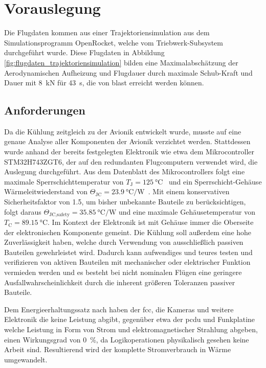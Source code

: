 \chapter{Vorauslegung}
\label{chap:Vorauslegung}



Die Flugdaten kommen aus einer Trajektoriensimulation aus dem Simulationsprogramm OpenRocket, welche vom Triebwerk-Subsystem durchgeführt wurde.
Diese Flugdaten in Abbildung \ref{fig:flugdaten_trajektoriensimulation} bilden eine Maximalabschätzung der Aerodynamischen Aufheizung und Flugdauer durch
maximale Schub-Kraft und Dauer mit \SI{8}{\kilo\newton} für \SI{43}{\second}, die von \ac{blast} erreicht werden können.

\section{Anforderungen}

Da die Kühlung zeitgleich zu der Avionik entwickelt wurde, musste auf eine genaue Analyse aller Komponenten der Avionik verzichtet werden.
Stattdessen wurde anhand der bereits festgelegten Elektronik wie etwa dem Mikrocontroller STM32H743ZGT6, der auf den redundanten Flugcomputern verwendet wird,
die Auslegung durchgeführt.
Aus dem Datenblatt des Mikrocontrollers folgt eine maximale Sperrschichttemperatur von $T_\text{J} = \SI{125}{\degreeCelsius}$~\cite{STM32}
und ein Sperrschicht-Gehäuse Wärmeleitwiederstand von $\Theta_\text{JC} = \SI{23.9}{\degreeCelsius\per\watt}$~\cite{STM32}. Mit einem konservativen
Sicherheitsfaktor von 1.5, um bisher unbekannte Bauteile zu berücksichtigen, folgt daraus $\Theta_\text{JC,safety} = \SI{35.85}{\degreeCelsius\per\watt}$
und eine maximale Gehäusetemperatur von $T_\text{C} = \SI{89.15}{\degreeCelsius}$. Im Kontext der Elektronik ist mit Gehäuse immer die
Oberseite der elektronischen Komponente gemeint.
Die Kühlung soll außerdem eine hohe Zuverlässigkeit haben, welche durch Verwendung von ausschließlich passiven Bauteilen gewehrleistet wird.
Dadurch kann aufwendiges und teures testen und verifizieren von aktiven Bauteilen mit mechanischer oder elektrischer Funktion vermieden werden und es besteht bei
nicht nominalen Flügen eine geringere Ausfallwahrscheinlichkeit durch die inherent größeren Toleranzen passiver Bauteile.

Dem Energieerhaltungssatz nach haben der \ac{fcc}, die Kameras und weitere Elektronik die keine Leistung abgibt, gegenüber etwa
der \ac{pcdu} und Funkplatine welche Leistung in Form von Strom und elektromagnetischer Strahlung abgeben, einen Wirkungsgrad von
\SI{0}{\percent}, da Logikoperationen physikalisch gesehen keine Arbeit sind. Resultierend wird der komplette Stromverbrauch
in Wärme umgewandelt.

